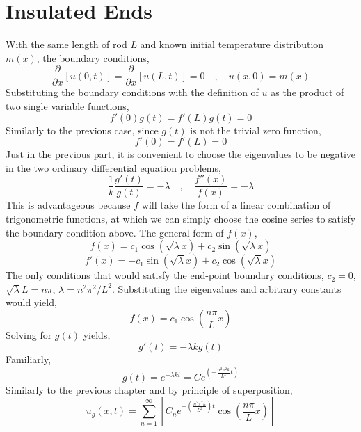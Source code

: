 \section{Insulated Ends}
\begin{comment} 
\end{comment}
With the same length of rod $L$ and known initial temperature distribution $m(x)$, the boundary conditions,
$$\frac{\partial}{\partial x}\left[u(0,t)\right] = \frac{\partial}{\partial x}\left[u(L,t)\right] = 0\quad,\quad u(x,0) = m(x)$$
Substituting the boundary conditions with the definition of $u$ as the product of two single variable functions,
$$f'(0)g(t) = f'(L)g(t) = 0$$
Similarly to the previous case, since $g(t)$ is not the trivial zero function,
$$f'(0) = f'(L) = 0$$
Just in the previous part, it is convenient to choose the eigenvalues to be negative in the two ordinary differential equation problems,
$$\frac{1}{k}\frac{g'(t)}{g(t)} = -\lambda \quad,\quad \frac{f''(x)}{f(x)} = -\lambda$$
This is advantageous because $f$ will take the form of a linear combination of trigonometric functions, at which we can simply choose the cosine series to satisfy the boundary condition above. The general form of $f(x)$,
$$f(x) = c_1\cos\left(\sqrt{\lambda}x\right) + c_2\sin\left(\sqrt{\lambda}x\right)$$
$$f'(x) = -c_1\sin\left(\sqrt{\lambda}x\right) + c_2\cos\left(\sqrt{\lambda}x\right)$$
The only conditions that would satisfy the end-point boundary conditions, $c_2 = 0$, $\sqrt{\lambda}L = n\pi$, $\lambda = n^2\pi^2/L^2$. Substituting the eigenvalues and arbitrary constants would yield,
$$f(x) = c_1\cos\left(\frac{n\pi}{L}x\right)$$
Solving for $g(t)$ yields,
$$g'(t) = -\lambda k g(t)$$
Familiarly,
$$g(t) =  e^{-\lambda k t} = Ce^{\displaystyle{\left(-\frac{n^2\pi^2k}{L^2} t\right)}}$$
Similarly to the previous chapter and by principle of superposition,
$$u_g(x,t) = \sum^{\infty}_{n=1}\left[C_ne^{\displaystyle{-\left(\frac{n^2\pi^2k}{L^2}\right)t}}\cos\left(\frac{n\pi}{L} x\right)\right]$$
